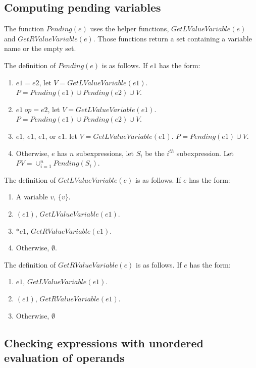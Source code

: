 \subsection{Computing pending variables}

The function $Pending(e)$ uses the helper functions,
$GetLValueVariable(e)$ and $GetRValueVariable(e)$.  Those functions
return a set containing a variable name or the empty set.

The definition of $Pending(e)$ is as follows. If $e1$ has the form:
\begin{enumerate}
\item $e1 = e2$, let $V = GetLValueVariable(e1)$.
$P = Pending(e1) \cup Pending(e2) \cup V$.
\item$e1~op= e2$, let $V = GetLValueVariable(e1)$.
$P = Pending(e1) \cup Pending(e2) \cup V$.
\item \code{++}$e1$, \code{--}$e1$, $e1$\code{++}, or $e1$\code{--}.
let $V =  GetLValueVariable(e1)$.  $P = Pending(e1) \cup V$.
\item Otherwise, $e$ has $n$ subexpressions, let $S_i$ be
the $i^{th}$ subexpression.  Let $PV = \cup_{i=1}^{n} Pending(S_i)$.
\end{enumerate}

The definition of $GetLValueVariable(e)$ is as follows. If $e$ has the form:
\begin{enumerate}
\item A variable $v$, $\{ v \}$.
\item $(e1)$, $GetLValueVariable(e1)$.
\item $*e1$, $GetRValueVariable(e1)$.
\item Otherwise, $\emptyset$.
\end{enumerate}

The definition of $GetRValueVariable(e)$ is as follows. If $e$ has the form:
\begin{enumerate}
\item \code{&}$e1$, $GetLValueVariable(e1)$.
\item$(e1)$, $GetRValueVariable(e1)$.
\item Otherwise, $\emptyset$
\end{enumerate}

\subsection{Checking expressions with unordered evaluation of operands}

